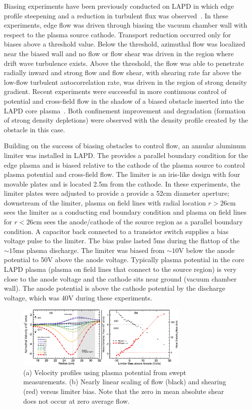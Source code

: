 \documentclass[aps,prl,amsmath,amssymb,preprint,superscriptaddress]{revtex4}
\begin{document}
Biasing experiments have been previously conducted on LAPD in which edge profile steepening and a reduction in turbulent flux was observed~\cite{maggs07,carter09}. In these experiments, edge flow was driven through biasing the vacuum chamber wall with respect to the plasma source cathode.  Transport reduction occurred only for biases above a threshold value.  Below the threshold, azimuthal flow was localized near the biased wall and no flow or flow shear was driven in the region where drift wave turbulence exists.  Above the threshold, the flow was able to penetrate radially inward and strong flow and flow shear, with shearing rate far above the low-flow turbulent autocorrelation rate, was driven in the region of strong density gradient.   Recent experiments were successful in more continuous control of potential and cross-field flow in the shadow of a biased obstacle inserted into the LAPD core plasma~\cite{zhou12}.  Both confinement improvement and degradation (formation of strong density depletions) were observed with the density profile created by the obstacle in this case.  

Building on the success of biasing obstacles to control flow, an annular aluminum limiter was installed in LAPD. The provides a parallel boundary condition for the edge plasma and is biased relative to the cathode of the plasma source to control plasma potential and cross-field flow.  The limiter is
an iris-like design with four movable plates and is located 2.5m from
the cathode.  In these experiments, the limiter plates were adjusted
to provide a provide a 52cm diameter aperture; downstream of the
limiter, plasma on field lines with radial location $r>26$cm sees the
limiter as a conducting end boundary condition and plasma on field
lines for $r<26$cm sees the anode/cathode of the source region as a
parallel boundary condition.  A capacitor back connected to a transistor switch supplies a bias voltage pulse to the limiter.  The
bias pulse lasted 5ms during the flattop of the $\sim 15$ms plasma
discharge. The limiter was biased from $\sim 10$V below the anode
potential to 50V above the anode voltage.  Typically plasma potential
in the core LAPD plasma (plasma on field lines that connect to the
source region) is very close to the anode voltage and the cathode sits
near ground (vacuum chamber wall).  The anode potential is above the
cathode potential by the discharge voltage, which was 40V during these experiments.

\begin{figure}[!htbp]
\centerline{
\includegraphics[width=8.5cm]{velocity_flowshear.pdf}}
\caption{\label{fig:velocity_flowshear} (a) Velocity profiles using plasma potential from swept measurements. (b) Nearly linear scaling of flow (black) and shearing (red) versus limiter bias. Note that the zero in mean absolute shear does not occur at zero average flow.}
\end{figure}
\end{document}
